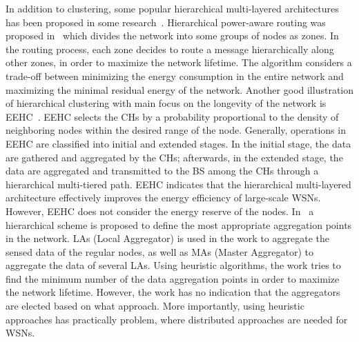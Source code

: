 \documentclass[journal]{IEEEtran}
\begin{document}
In addition to clustering, some popular hierarchical multi-layered architectures has been proposed in some research~\cite{hierarchical2001,EEHC2003,karaki2004,karaki2009}. Hierarchical power-aware routing was proposed in~\cite{hierarchical2001} which divides the network into some groups of nodes as zones. In the routing process, each zone decides to route a message hierarchically along other zones, in order to maximize the network lifetime. The algorithm considers a trade-off between minimizing the energy consumption in the entire network and maximizing the minimal residual energy of the network. 
Another good illustration of hierarchical clustering with main focus on the longevity of the network is EEHC~\cite{EEHC2003}. EEHC selects the CHs by a probability proportional to the density of neighboring nodes within the desired range of the node. Generally, operations in EEHC are classified into initial and extended stages. In the initial stage, the data are gathered and aggregated by the CHs; afterwards, in the extended stage, the data are aggregated and transmitted to the BS among the CHs through a hierarchical multi-tiered path.  EEHC indicates that the hierarchical multi-layered architecture effectively improves the energy efficiency of large-scale WSNs.  However, EEHC does not consider the energy reserve of the nodes.
In~\cite{karaki2004,karaki2009} a hierarchical scheme is proposed to define the most appropriate aggregation points in the network.  LAs (Local Aggregator) is used in the work to aggregate the sensed data of the regular nodes, as well as MAs (Master Aggregator) to aggregate the data of several LAs.  Using heuristic algorithms, the work tries to find the minimum number of the data aggregation points in order to maximize the network lifetime.  However, the work has no indication that the aggregators are elected based on what approach. More importantly, using heuristic approaches has practically problem, where distributed approaches are needed for WSNs.
\end{document}
